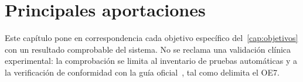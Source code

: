 
\chapter{Principales aportaciones}
\label{cap:aportaciones}

Este capítulo pone en correspondencia cada objetivo específico
del~\cref{cap:objetivos} con un resultado comprobable del sistema.
No se reclama una validación clínica experimental: la comprobación se
limita al inventario de pruebas automáticas y a la verificación de conformidad
con la guía
oficial~\cite{omahony2023stopp,sacyl2023stopp}, tal como delimita el
OE7.

